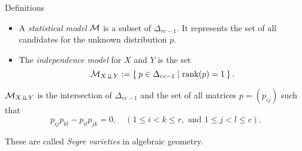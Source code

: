 \begin{frame}

    \begin{block}{Definitions}
        \begin{itemize}
        \item A \emph{statistical model} $\mathcal{M}$ is a subset of $\Delta_{rc-1}$. It represents the set of all candidates for the unknown distribution $p$.

        \item The \emph{independence model} for $X$ and $Y$ is the set
        $$ \mathcal{M}_{X \perp \!\!\! \perp Y} := \Set{ p \in \Delta_{rc - 1} | \rank(p) = 1 }. $$
        \end{itemize}
    \end{block}

    $\mathcal{M}_{X \perp \!\!\! \perp Y}$ is the intersection of $\Delta_{rc-1}$ and the set of all matrices $p = (p_{ij})$ such that
    $$ p_{ij}p_{kl} - p_{il}p_{jk} = 0, \quad (1 \leq i < k \leq r, \text{ and } 1 \leq j < l \leq c). $$

    These are called \emph{Segre varieties} in algebraic geometry.

\end{frame}
